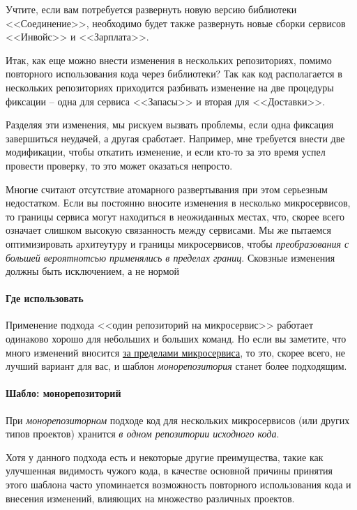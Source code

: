 \documentclass[%
	11pt,
	a4paper,
	utf8,
		]{article}
\begin{document}
Учтите, если вам потребуется развернуть новую версию библиотеки <<Соединение>>, необходимо будет также развернуть новые сборки сервисов <<Инвойс>> и <<Зарплата>>.

Итак, как еще можно внести изменения в нескольких репозиториях, помимо повторного использования кода через библиотеки? Так как код располагается в нескольких репозиториях приходится разбивать изменение на две процедуры фиксации -- одна для сервиса <<Запасы>> и вторая для <<Доставки>>.

Разделяя эти изменения, мы рискуем вызвать проблемы, если одна фиксация завершиться неудачей, а другая сработает. Например, мне требуется внести две модификации, чтобы откатить изменение, и если кто-то за это время успел провести проверку, то это может оказаться непросто.

Многие считают отсутствие атомарного развертывания при этом серьезным недостатком. Если вы постоянно вносите изменения в несколько микросервисов, то границы сервиса могут находиться в неожиданных местах, что, скорее всего означает слишком высокую связанность между сервисами. Мы же пытаемся оптимизировать архитеутуру и границы микросервисов, чтобы \emph{преобразования с большей вероятнотсью применялись в пределах границ}. {\color{blue}Сковзные изменения должны быть исключением, а не нормой}

\paragraph{Где использовать} Применение подхода <<один репозиторий на микросервис>> работает одинаково хорошо для небольших и больших команд. {\color{red}Но если вы заметите, что много изменений вносится \underline{за пределами микросервиса}, то это, скорее всего, не лучший вариант для вас}, и шаблон \emph{монорепозитория} станет более подходящим.

\paragraph{Шабло: монорепозиторий} При \emph{монорепозиторном} подходе код для нескольких микросервисов (или других типов проектов) хранится \emph{в одном репозитории исходного кода}.

Хотя у данного подхода есть и некоторые другие преимущества, такие как улучшенная видимость чужого кода, в качестве основной причины принятия этого шаблона часто упоминается возможность повторного использования кода и внесения изменений, влияющих на множество различных проектов.
\end{document}
